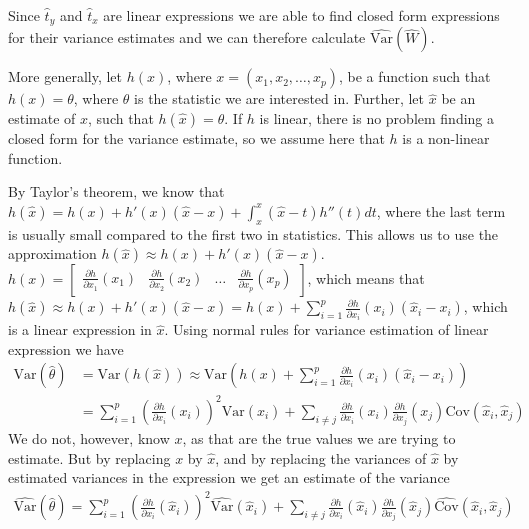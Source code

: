 \documentclass{article}
\begin{document}
\begin{example}
    Since \(\hat{t}_y\) and \(\hat{t}_x\) are linear expressions we are able to
    find closed form expressions for their variance estimates and we can
    therefore calculate \(\widehat{\mathrm{Var}} \left( \widehat{W} \right)\).

\end{example}

More generally, let \(h(x)\), where \(x = (x_1, x_2, \dots, x_p)\), be a function such that \(h(x) = \theta\), where
\(\theta\) is the statistic we are interested in. Further, let \(\hat{x}\) be an
estimate of \(x\), such that \(h(\hat{x}) = \hat{\theta}\). If \(h\) is
linear, there is no problem finding a closed form for the variance estimate,
so we assume here that \(h\) is a non-linear function.

By Taylor's theorem, we know that \(h(\hat{x}) = h(x) + h'(x) (\hat{x} - x) + \int_x^x  (\hat{x} -
t) h''(t) dt\), where the last term is usually small compared to the first two
in statistics. This allows us to use the approximation \(h(\hat{x}) \approx h(x) +
h'(x) (\hat{x} - x)\). \(h(x) = \begin{bmatrix} \frac{\partial h}{\partial x_1}
  (x_1) & \frac{\partial h}{\partial x_2} (x_2) & \dots & \frac{\partial
    h}{\partial x_p} (x_p)\end{bmatrix}\), which means that \(h(\hat{x}) \approx
h(x) + h'(x) (\hat{x} -
x) = h(x) + \sum_{i = 1}^p \frac{\partial h}{\partial x_i} (x_i) \left( \hat{x}_i - x_i
\right)\), which is a linear expression in \(\hat{x}\). Using normal rules for
variance estimation of linear expression we have
\begin{align*}
  \mathrm{Var} \left( \hat{\theta} \right)
  &= \mathrm{Var} \left( h(\hat{x}) \right)
  \approx \mathrm{Var} \left( h(x) + \sum_{i = 1}^p \frac{\partial h}{\partial x_i} (x_i) \left( \hat{x}_i - x_i
    \right) \right) \\
    &= \sum_{i = 1}^p \left( \frac{\partial h}{\partial x_i} (x_i)  \right)^2 \mathrm{Var} \left( \hat{x}_i \right) + \sum_{i \neq j}  \frac{\partial h}{\partial x_i} (x_i)  \frac{\partial h}{\partial x_j} (x_j)  \mathrm{Cov} \left( \hat{x}_i, \hat{x}_j \right)
\end{align*}
We do not, however, know \(x\), as that are the true values we are trying to
estimate. But by replacing \(x\) by \(\hat{x}\), and by replacing the variances
of \(\hat{x}\) by estimated variances in the expression we get an
estimate of the variance
\begin{align*}
  \widehat{\mathrm{Var}} \left( \hat{\theta} \right)
  = \sum_{i = 1}^p \left( \frac{\partial h}{\partial x_i} (\hat{x}_i)  \right)^2 \widehat{\mathrm{Var}} \left( \hat{x}_i \right) + \sum_{i \neq j}  \frac{\partial h}{\partial x_i} (\hat{x}_i)  \frac{\partial h}{\partial x_j} (\hat{x}_j)  \widehat{\mathrm{Cov}} \left( \hat{x}_i, \hat{x}_j \right)
\end{align*}
\end{document}

